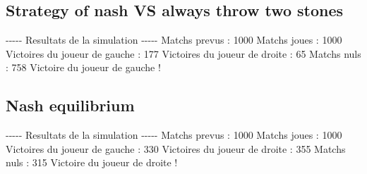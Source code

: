 \documentclass{article}%
\begin{document}
%
\subsection{Strategy of nash VS always throw two stones}%
\label{subsec:Strategy of nash VS always throw two stones}%
{-}{-}{-}{-}{-} Resultats de la simulation {-}{-}{-}{-}{-}\newline%
		\newline%
Matchs prevus : 1000\newline%
Matchs joues : 1000\newline%
\newline%
Victoires du joueur de gauche : 177\newline%
Victoires du joueur de droite : 65\newline%
Matchs nuls : 758\newline%
\newline%
Victoire du joueur de gauche !

%
\subsection{Nash equilibrium}%
\label{subsec:Nash equilibrium}%
{-}{-}{-}{-}{-} Resultats de la simulation {-}{-}{-}{-}{-}\newline%
		\newline%
Matchs prevus : 1000\newline%
Matchs joues : 1000\newline%
\newline%
Victoires du joueur de gauche : 330\newline%
Victoires du joueur de droite : 355\newline%
Matchs nuls : 315\newline%
\newline%
Victoire du joueur de droite !

%
\end{document}
